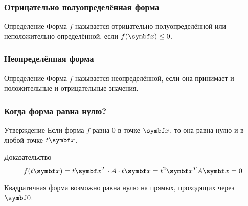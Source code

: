 \begin{frame}
\frametitle{Отрицательно полуопределённая форма}

\begin{block}{Определение}
    Форма $f$ называется \alert{отрицательно полуопределённой} или
    \alert{неположительно определённой}, если $f(\bx) \leq 0$.
\end{block}

    \pause

\begin{center}
\end{center}
    
\end{frame}



\begin{frame}
    \frametitle{Неопределённая форма}

    \begin{block}{Определение}
        Форма $f$ называется \alert{неопределённой}, если она принимает и положительные и отрицательные значения.
    \end{block}

    \pause

\begin{center}
\end{center}
    
\end{frame}



\begin{frame}
    \frametitle{Когда форма равна нулю?}

    \begin{block}{Утверждение}
        Если форма $f$ равна $0$ в точке $\bx$, то она равна нулю и
        в любой точке $t\bx$. 
    \end{block}
    \pause
    \begin{block}{Доказательство}
        \[
        f(t\bx) = t\bx^T \cdot A \cdot t\bx = t^2 \bx^T A \bx = 0
        \]
    \end{block}
    \pause
    Квадратичная форма возможно равна нулю на прямых, проходящих через $\bzero$.
    
\end{frame}